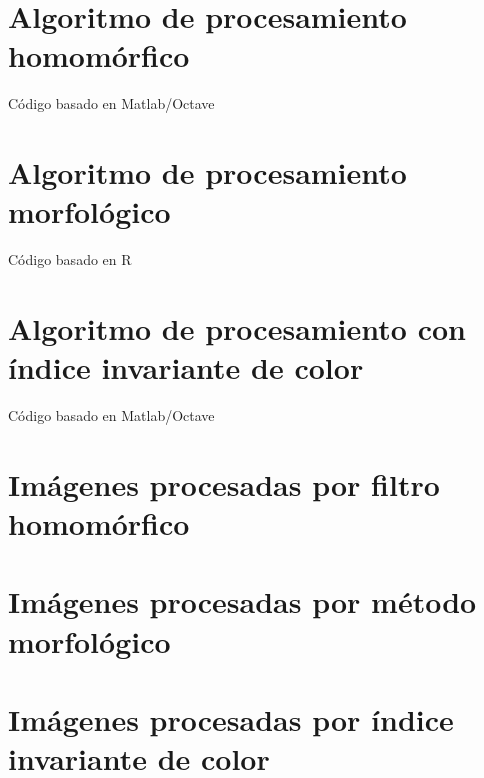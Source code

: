 \documentclass[11pt,a4paper]{report}
\begin{document}
\chapter{Algoritmo de procesamiento homomórfico}
\label{script_homo}
Código basado en Matlab/Octave


\chapter{Algoritmo de procesamiento morfológico} \label{script_morfo}
Código basado en R  


\chapter{Algoritmo de procesamiento con índice invariante de color} 
\label{script_iic}
Código basado en Matlab/Octave


\chapter{Imágenes procesadas por filtro homomórfico} \label{anexo_homo}
 
\chapter{Imágenes procesadas por método morfológico} \label{anexo_morfo}

 \chapter{Imágenes procesadas por índice invariante de color} \label{anexo_IIC}
 


%    

	


\printbibliography[title={Referencias}, heading=bibintoc]
\end{document}
